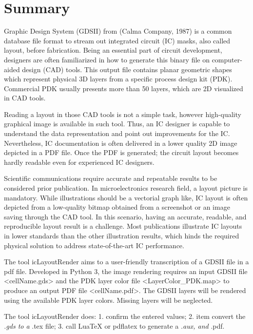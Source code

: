 \documentclass[10pt,a4paper,onecolumn]{article}
\begin{document}
\hypertarget{summary}{%
\section{Summary}\label{summary}}

Graphic Design System (GDSII) from (Calma Company, 1987) is a common
database file format to stream out integrated circuit (IC) masks, also
called layout, before fabrication. Being an essential part of circuit
development, designers are often familiarized in how to generate this
binary file on computer-aided design (CAD) tools. This output file
contains planar geometric shapes which represent physical 3D layers from
a specific process design kit (PDK). Commercial PDK usually presents
more than 50 layers, which are 2D visualized in CAD tools.

Reading a layout in those CAD tools is not a simple task, however
high-quality graphical image is available in such tool. Thus, an IC
designer is capable to understand the data representation and point out
improvements for the IC. Nevertheless, IC documentation is often
delivered in a lower quality 2D image depicted in a PDF file. Once the
PDF is generated; the circuit layout becomes hardly readable even for
experienced IC designers.

Scientific communications require accurate and repeatable results to be
considered prior publication. In microelectronics research field, a
layout picture is mandatory. While illustrations should be a vectorial
graph like, IC layout is often depicted from a low-quality bitmap
obtained from a screenshot or an image saving through the CAD tool. In
this scenario, having an accurate, readable, and reproducible layout
result is a challenge. Most publications illustrate IC layouts in lower
standards than the other illustration results, which hinds the required
physical solution to address state-of-the-art IC performance.

The tool icLayoutRender aims to a user-friendly transcription of a GDSII
file in a pdf file. Developed in Python 3, the image rendering requires
an input GDSII file \textless cellName.gds\textgreater{} and the PDK
layer color file \textless LayerColor\_PDK.map\textgreater{} to produce
an output PDF file \textless cellName.pdf\textgreater. The GDSII layers
will be rendered using the available PDK layer colors. Missing layers
will be neglected.

The tool icLayoutRender does: 1. confirm the entered values; 2. item
convert the \emph{.gds to a }.tex file; 3. call LuaTeX or pdflatex to
generate a \emph{.aux, and }.pdf.
\end{document}
